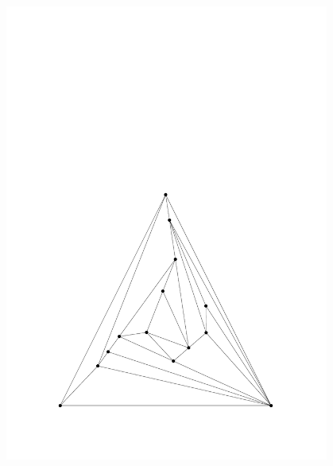 \begin{figure}
\centering
  \begin{minipage}{0.48\textwidth}
  \centering
    \includegraphics[width=0.95\textwidth]{vis_14_1.pdf}
  \end{minipage}
  \hfill
  \begin{minipage}{0.48\textwidth}
 \centering

\end{minipage}
\end{figure}
